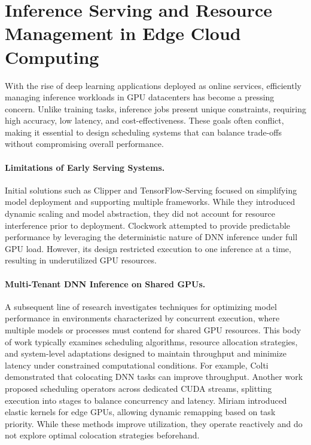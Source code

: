 \section{Inference Serving and Resource Management in Edge Cloud Computing}

With the rise of deep learning applications deployed as online services, efficiently managing inference workloads in GPU datacenters has become a pressing concern. Unlike training tasks, inference jobs present unique constraints, requiring high accuracy, low latency, and cost-effectiveness. These goals often conflict, making it essential to design scheduling systems that can balance trade-offs without compromising overall performance.

\paragraph{Limitations of Early Serving Systems.}
Initial solutions such as Clipper and TensorFlow-Serving focused on simplifying model deployment and supporting multiple frameworks. While they introduced dynamic scaling and model abstraction, they did not account for resource interference prior to deployment. Clockwork attempted to provide predictable performance by leveraging the deterministic nature of DNN inference under full GPU load. However, its design restricted execution to one inference at a time, resulting in underutilized GPU resources.

\paragraph{Multi-Tenant DNN Inference on Shared GPUs.}
A subsequent line of research investigates techniques for optimizing model performance in environments characterized by concurrent execution, where multiple models or processes must contend for shared GPU resources. This body of work typically examines scheduling algorithms, resource allocation strategies, and system-level adaptations designed to maintain throughput and minimize latency under constrained computational conditions. For example, Colti demonstrated that colocating DNN tasks can improve throughput. Another work proposed scheduling operators across dedicated CUDA streams, splitting execution into stages to balance concurrency and latency. Miriam introduced elastic kernels for edge GPUs, allowing dynamic remapping based on task priority. While these methods improve utilization, they operate reactively and do not explore optimal colocation strategies beforehand.


